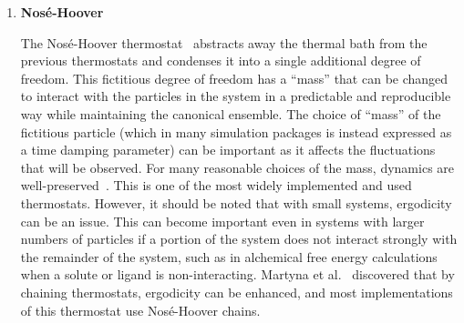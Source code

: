 \documentclass[9pt,bestpractices]{livecoms}
\begin{document}
\begin{enumerate}[listparindent=\parindent]
        The Langevin\cite{schneider1978molecular} thermostat supplements the microcanonical equations of motion with Brownian dynamics, thus including the viscosity and random collision effects of an implicit solvent.
        It uses a general equation of the form $F = F_{interaction} + F_{friction} + F_{random}$, where $F_{interaction}$ is the standard interactions calculated during the simulation, $F_{friction}$ is the damping used to tune the ``viscosity'' of the implicit bath, and $F_{random}$ effectively gives random collisions with solvent molecules.
        Careful consideration must be taken when choosing the friction damping parameter; in the limit of a zero damping parameter, the dynamics are microcanonical\footnote{With no damping this does not reduce to the Andersen thermostat, since no damping also means no random force because the magnitude of the damping is coupled to the magnitude of the random force by the fluctuation/dissipation theorem.}, and in the limit of an infinite damping parameter, the dynamics are purely Brownian.

    \item {\bf{Nos\'{e}-Hoover}}

        The Nos\'{e}-Hoover thermostat~\cite{thermostatAlgorithms2005} abstracts away the thermal bath from the previous thermostats and condenses it into a single additional degree of freedom.
        This fictitious degree of freedom has a ``mass'' that can be changed to interact with the particles in the system in a predictable and reproducible way while maintaining the canonical ensemble.
        The choice of ``mass'' of the fictitious particle (which in many simulation packages is instead expressed as a time damping parameter) can be important as it affects the fluctuations that will be observed.
        For many reasonable choices of the mass, dynamics are well-preserved~\cite{Basconi:2013:JChemTheoryComput}.
        This is one of the most widely implemented and used thermostats.
        However, it should be noted that with small systems, ergodicity can be an issue\cite{martyna1992nose,thermostatAlgorithms2005}.
        This can become important even in systems with larger numbers of particles if a portion of the system does not interact strongly with the remainder of the system, such as in alchemical free energy calculations when a solute or ligand is non-interacting.
        Martyna et al.~\cite{martyna1992nose} discovered that by chaining thermostats, ergodicity can be enhanced, and most implementations of this thermostat use Nos\'{e}-Hoover chains.

\end{enumerate}
\end{document}
